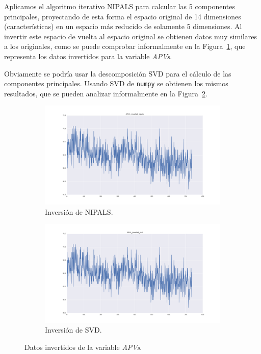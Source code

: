 \documentclass[11pt,spanish,listoffigures,listoftables]{tfgetsinf}
\begin{document}
    Aplicamos el algoritmo iterativo NIPALS para calcular las 5 componentes principales, proyectando de esta forma el espacio original de 14 dimensiones (características) en un espacio más reducido de solamente 5 dimensiones. Al invertir este espacio de vuelta al espacio original se obtienen datos muy similares a los originales, como se puede comprobar informalmente en la Figura~\ref{fig:APVs_inverted_nipals}, que representa los datos invertidos para la variable {\em APVs}.
    
    Obviamente se podría usar la descomposición SVD para el cálculo de las componentes principales. Usando SVD de {\tt numpy} se obtienen los mismos resultados, que se pueden analizar informalmente en la Figura~\ref{fig:APVs_inverted_svd}. 
    
    \begin{figure}[H]
        \centering
        \begin{subfigure}[h]{0.49\textwidth}
            \centering
            \includegraphics[width=\textwidth]{APVs_inverted_nipals.png}
            \caption{Inversión de NIPALS.}
            \label{fig:APVs_inverted_nipals}
        \end{subfigure}
        \begin{subfigure}[h]{0.49\textwidth}
            \centering
            \includegraphics[width=\textwidth]{APVs_inverted_svd.png}
            \caption{Inversión de SVD.}
            \label{fig:APVs_inverted_svd}
        \end{subfigure}
        \caption{Datos invertidos de la variable {\em APVs}.}
        \label{fig:APVs_inverted}
    \end{figure}    
    
\end{document}
